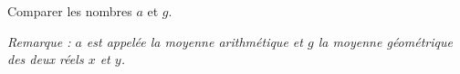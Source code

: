 \documentclass[10pt,a4paper,openany,twoside, eleve]{book}
\begin{document}
\begin{exercicesnofoot}
\begin{exo}
		Comparer les nombres $a$ et $g$.

		\emph{Remarque : $a$ est appelée la moyenne arithmétique et $g$ la moyenne géométrique des deux réels $x$ et $y$.}
	\end{exo}



\end{exercicesnofoot}
\end{document}
